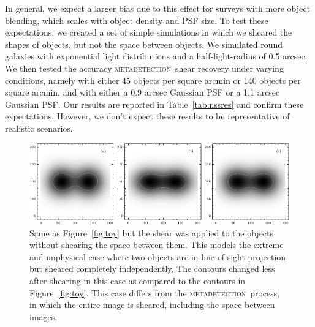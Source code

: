 \documentclass[iop, twocolappendix, appendixfloats, numberedappendix, apj]{hackemulateapj}
\newcommand{\mdet}{\textsc{metadetection}}
\begin{document}
In general, we expect a larger bias due to this effect for surveys with more
object blending, which scales with object density and PSF size.  To test these
expectations, we created a set of simple simulations in which we sheared the
shapes of objects, but not the space between objects.  We simulated round
galaxies with exponential light distributions and a half-light-radius of 0.5
arcsec. We then tested the accuracy \mdet\ shear recovery under varying
conditions, namely with either 45 objects per square arcmin or 140 objects per
square arcmin, and with either a 0.9 arcsec Gaussian PSF or a 1.1 arcsec
Gaussian PSF. Our results are reported in Table~\ref{tab:nssres} and confirm
these expectations. However, we don't expect these results to be representative
of realistic scenarios.


\begin{figure}
    \begin{center}
        \includegraphics[width=\textwidth]{figures/toy-no-full-scene.pdf}

        \caption{Same as Figure~\ref{fig:toy} but the shear was applied to the
        objects without shearing the space between them. This models the extreme
        and unphysical case where two objects are in line-of-sight projection but
        sheared completely independently.  The contours changed less after shearing
        in this case as compared to the contours in Figure~\ref{fig:toy}.  This
        case differs from the \mdet\ process, in which the entire image is sheared,
        including the space between images.  \label{fig:toynoscene} }
    \end{center}

\end{figure}
\end{document}
